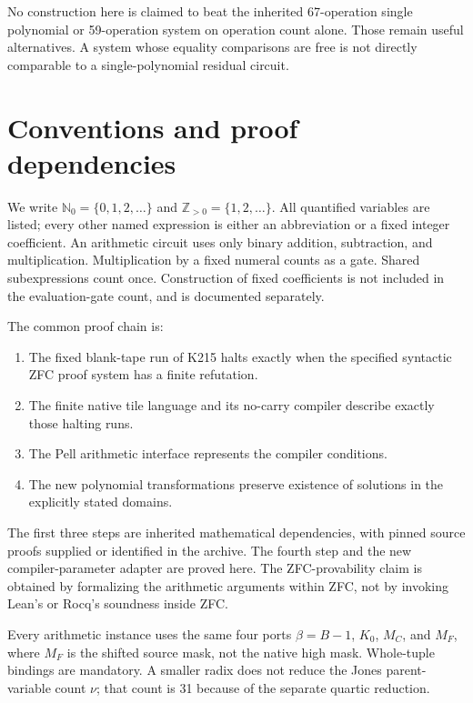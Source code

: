 \documentclass[
  10pt,
]{article}
\providecommand{\tightlist}{%
  \setlength{\itemsep}{0pt}\setlength{\parskip}{0pt}}
\begin{document}
No construction here is claimed to beat the inherited 67-operation
single polynomial or 59-operation system on operation count alone. Those
remain useful alternatives. A system whose equality comparisons are free
is not directly comparable to a single-polynomial residual circuit.

\section{Conventions and proof
dependencies}\label{conventions-and-proof-dependencies}

We write \(\mathbb N_0=\{0,1,2,\ldots\}\) and
\(\mathbb Z_{>0}=\{1,2,\ldots\}\). All quantified variables are listed;
every other named expression is either an abbreviation or a fixed
integer coefficient. An arithmetic circuit uses only binary addition,
subtraction, and multiplication. Multiplication by a fixed numeral
counts as a gate. Shared subexpressions count once. Construction of
fixed coefficients is not included in the evaluation-gate count, and is
documented separately.

The common proof chain is:

\begin{enumerate}
\def\labelenumi{\arabic{enumi}.}
\tightlist
\item
  The fixed blank-tape run of K215 halts exactly when the specified
  syntactic ZFC proof system has a finite refutation.
\item
  The finite native tile language and its no-carry compiler describe
  exactly those halting runs.
\item
  The Pell arithmetic interface represents the compiler conditions.
\item
  The new polynomial transformations preserve existence of solutions in
  the explicitly stated domains.
\end{enumerate}

The first three steps are inherited mathematical dependencies, with
pinned source proofs supplied or identified in the archive. The fourth
step and the new compiler-parameter adapter are proved here. The
ZFC-provability claim is obtained by formalizing the arithmetic
arguments within ZFC, not by invoking Lean's or Rocq's soundness inside
ZFC.

Every arithmetic instance uses the same four ports \(\beta=B-1\),
\(K_0\), \(M_C\), and \(M_F\), where \(M_F\) is the shifted source mask,
not the native high mask. Whole-tuple bindings are mandatory. A smaller
radix does not reduce the Jones parent-variable count \(\nu\); that
count is 31 because of the separate quartic reduction.
\end{document}
